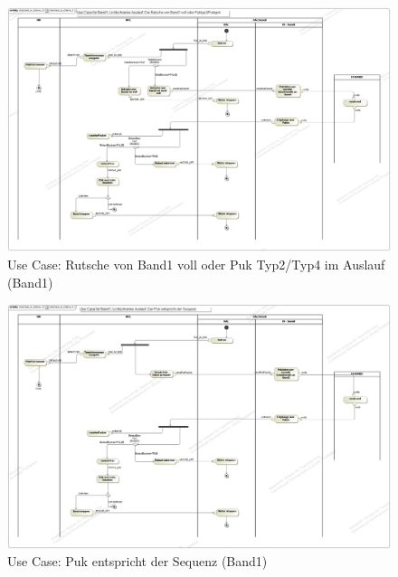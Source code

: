 \documentclass[
   draft=false
  ,paper=a4
  ,twoside=true
  ,fontsize=11pt
  ,headsepline
  ,DIV11
  ,parskip=full+
]{scrartcl} %
\begin{document}
\begin{figure}[H]
\begin{addmargin*}[-2.3cm]{-0.1\textwidth}

  	\centering
    \includegraphics [width=1.3\textwidth]{./IMG/UseCaseInOutrun1.png}
    \caption[short Name]{Use Case: Rutsche von Band1 voll oder Puk Typ2/Typ4 im Auslauf (Band1)}
    	\label{fig:uc3slide}
\end{addmargin*}
\end{figure}

\begin{figure}[H]
\begin{addmargin*}[-2.3cm]{-0.15\textwidth}
  	\centering
    \includegraphics [width=1.3\textwidth]{./IMG/UseCaseInOutrun2.png}
    \caption[short Name]{Use Case: Puk entspricht der Sequenz (Band1)}
    	\label{fig:uc3slide}
\end{addmargin*}
\end{figure}
\end{document}
